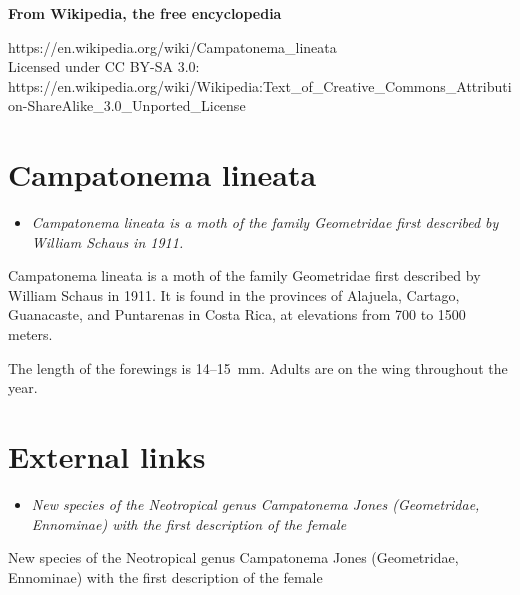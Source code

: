 \textbf{From Wikipedia, the free encyclopedia}

https://en.wikipedia.org/wiki/Campatonema\_lineata\\
Licensed under CC BY-SA 3.0:\\
https://en.wikipedia.org/wiki/Wikipedia:Text\_of\_Creative\_Commons\_Attribution-ShareAlike\_3.0\_Unported\_License

\section{Campatonema lineata}\label{campatonema-lineata}

\begin{itemize}
\item
  \emph{Campatonema lineata is a moth of the family Geometridae first
  described by William Schaus in 1911.}
\end{itemize}

Campatonema lineata is a moth of the family Geometridae first described
by William Schaus in 1911. It is found in the provinces of Alajuela,
Cartago, Guanacaste, and Puntarenas in Costa Rica, at elevations from
700 to 1500 meters.

The length of the forewings is 14--15~mm. Adults are on the wing
throughout the year.

\section{External links}\label{external-links}

\begin{itemize}
\item
  \emph{New species of the Neotropical genus Campatonema Jones
  (Geometridae, Ennominae) with the first description of the female}
\end{itemize}

New species of the Neotropical genus Campatonema Jones (Geometridae,
Ennominae) with the first description of the female
